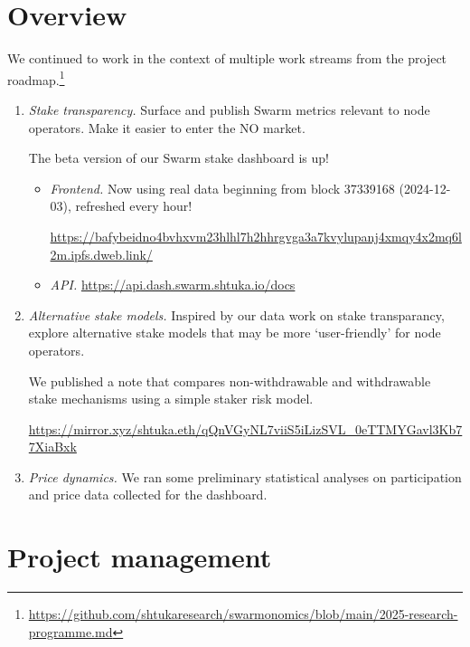 \maketitle
\section*{Overview}

We continued to work in the context of multiple work streams from the project roadmap.\footnote{\url{https://github.com/shtukaresearch/swarmonomics/blob/main/2025-research-programme.md}}

\begin{enumerate}
\item \emph{Stake transparency.} Surface and publish Swarm metrics relevant to node operators. Make it easier to enter the NO market.

The beta version of our Swarm stake dashboard is up!

\begin{itemize}
  \item \emph{Frontend.} Now using real data beginning from block 37339168 (2024-12-03), refreshed every hour! 
  
  {\small \url{https://bafybeidno4bvhxvm23hlhl7h2hhrgvga3a7kvylupanj4xmqy4x2mq6l2m.ipfs.dweb.link/}}
  \item \emph{API.} \url{https://api.dash.swarm.shtuka.io/docs}
\end{itemize}

\item \emph{Alternative stake models.} Inspired by our data work on stake transparancy, explore alternative stake models that may be more `user-friendly' for node operators.

We published a note that compares non-withdrawable and withdrawable stake mechanisms using a simple staker risk model. 

\url{https://mirror.xyz/shtuka.eth/qQnVGyNL7viiS5iLizSVL_0eTTMYGavl3Kb77XiaBxk}

\item \emph{Price dynamics.} We ran some preliminary statistical analyses on participation and price data collected for the dashboard.

\end{enumerate}


\section*{Project management}

